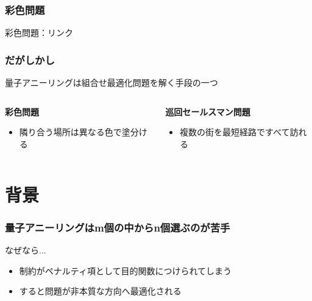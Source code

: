 \begin{frame}
  \frametitle{彩色問題}
  彩色問題：リンク\\
\end{frame}


\begin{frame}
  \frametitle{だがしかし}

  {\Large  量子アニーリングは組合せ最適化問題を解く手段の一つ}
  \vspace{5mm}

  \begin{columns}
    \begin{column}{0.45\textwidth}
      \textbf{彩色問題}
      \begin{itemize}
          \item 隣り合う場所は異なる色で塗分ける
      \end{itemize}
    \end{column}

    \begin{column}{0.45\textwidth}
      \textbf{巡回セールスマン問題}
      \begin{itemize}
          \item 複数の街を最短経路ですべて訪れる
      \end{itemize}
    \end{column}
  \end{columns}
  \vspace{10mm}
\end{frame}

\section{背景}
\begin{frame}
  \frametitle{量子アニーリングはm個の中からn個選ぶのが苦手}
  
  なぜなら...\\
  \begin{itemize}
    \item 制約がペナルティ項として目的関数につけられてしまう
    \item すると問題が非本質な方向へ最適化される
  \end{itemize}

  \vspace{5mm}



\end{frame}

